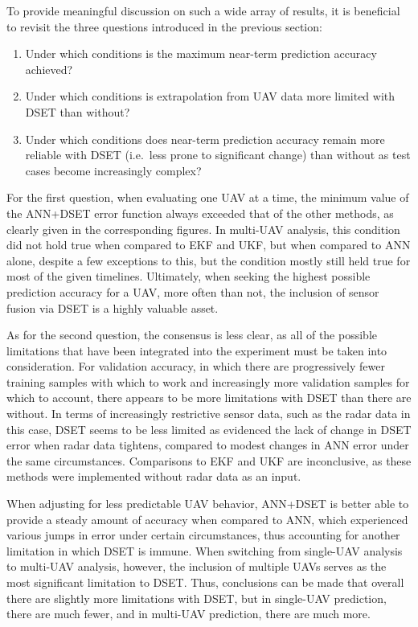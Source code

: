 \documentclass[12pt]{uthesis-v12}  %
\begin{document}
To provide meaningful discussion on such a wide array of results, it is beneficial to revisit the three questions introduced in the previous section:
\begin{enumerate}
\item Under which conditions is the maximum near-term prediction accuracy achieved?
\item Under which conditions is extrapolation from UAV data more limited with DSET than without?
\item Under which conditions does near-term prediction accuracy remain more reliable with DSET (i.e.~less prone to significant change) than without as test cases become increasingly complex?
\end{enumerate}
For the first question, when evaluating one UAV at a time, the minimum value of the ANN+DSET error function always exceeded that of the other methods, as clearly given in the corresponding figures. In multi-UAV analysis, this condition did not hold true when compared to EKF and UKF, but when compared to ANN alone, despite a few exceptions to this, but the condition mostly still held true for most of the given timelines. Ultimately, when seeking the highest possible prediction accuracy for a UAV, more often than not, the inclusion of sensor fusion via DSET is a highly valuable asset.

As for the second question, the consensus is less clear, as all of the possible limitations that have been integrated into the experiment must be taken into consideration. For validation accuracy, in which there are progressively fewer training samples with which to work and increasingly more validation samples for which to account, there appears to be more limitations with DSET than there are without. In terms of increasingly restrictive sensor data, such as the radar data in this case, DSET seems to be less limited as evidenced the lack of change in DSET error when radar data tightens, compared to modest changes in ANN error under the same circumstances. Comparisons to EKF and UKF are inconclusive, as these methods were implemented without radar data as an input. 

When adjusting for less predictable UAV behavior, ANN+DSET is better able to provide a steady amount of accuracy when compared to ANN, which experienced various jumps in error under certain circumstances, thus accounting for another limitation in which DSET is immune. When switching from single-UAV analysis to multi-UAV analysis, however, the inclusion of multiple UAVs serves as the most significant limitation to DSET. Thus, conclusions can be made that overall there are slightly more limitations with DSET, but in single-UAV prediction, there are much fewer, and in multi-UAV prediction, there are much more.
\end{document}
